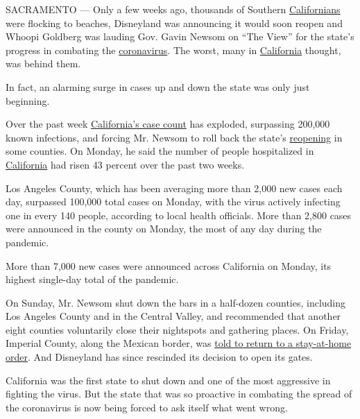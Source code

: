 SACRAMENTO --- Only a few weeks ago, thousands of Southern
\href{https://www.nytimes.com/2020/07/16/us/california-coronavirus-cases.html}{Californians}
were flocking to beaches, Disneyland was announcing it would soon reopen
and Whoopi Goldberg was lauding Gov. Gavin Newsom on ``The View'' for
the state's progress in combating the
\href{https://www.nytimes.com/2020/07/16/us/california-coronavirus-cases.html}{coronavirus}.
The worst, many in
\href{https://www.nytimes.com/2020/07/14/us/california-counties-reopening.html}{California}
thought, was behind them.

In fact, an alarming surge in cases up and down the state was only just
beginning.

Over the past week
\href{https://www.nytimes.com/2020/07/23/us/california-covid-19-cases.html}{California's
case count} has exploded, surpassing 200,000 known infections, and
forcing Mr. Newsom to roll back the state's
\href{https://www.nytimes.com/2020/06/30/us/coronavirus-california-cases-rising.html}{reopening}
in some counties. On Monday, he said the number of people hospitalized
in
\href{https://www.nytimes.com/2020/06/30/us/coronavirus-california-cases-rising.html}{California}
had risen 43 percent over the past two weeks.

Los Angeles County, which has been averaging more than 2,000 new cases
each day, surpassed 100,000 total cases on Monday, with the virus
actively infecting one in every 140 people, according to local health
officials. More than 2,800 cases were announced in the county on Monday,
the most of any day during the pandemic.

More than 7,000 new cases were announced across California on Monday,
its highest single-day total of the pandemic.

On Sunday, Mr. Newsom shut down the bars in a half-dozen counties,
including Los Angeles County and in the Central Valley, and recommended
that another eight counties voluntarily close their nightspots and
gathering places. On Friday, Imperial County, along the Mexican border,
was
\href{https://www.nytimes.com/2020/06/26/us/coronavirus-florida-texas-bars-closing.html}{told
to return to a stay-at-home order}. And Disneyland has since rescinded
its decision to open its gates.

California was the first state to shut down and one of the most
aggressive in fighting the virus. But the state that was so proactive in
combating the spread of the coronavirus is now being forced to ask
itself what went wrong.

